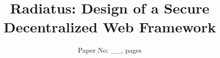 \documentclass{sig-alternate-10pt}
\begin{document}
\title{Radiatus: Design of a Secure Decentralized Web Framework}

%
%
%
%
%

%
\author{
%
%
\alignauthor
Paper No: \_\_, \pageref{LastPage} pages
}

\maketitle
\end{document}
